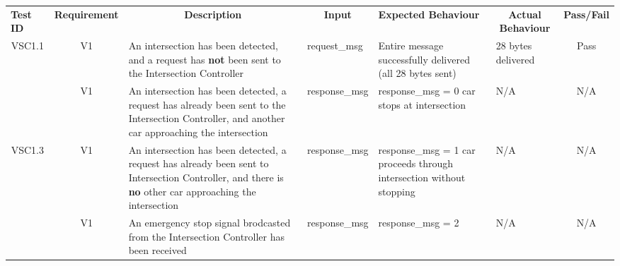\documentclass [10pt]{article}
\begin{document}
    
 \begin{longtable}{ | p{ } | p{ } |  p{ } |  p{ } | p{ } | p{ } |  p{ } |}  \hline

    \rowcolor{subsectionC}\textbf{Test ID}  
    & \textbf{Requirement}
    & \multicolumn{1}{c|}{\textbf{Description} }
    & \multicolumn{1}{c|}{\textbf{Input} }
    & \textbf{Expected Behaviour} 
    & \multicolumn{1}{c|}{\textbf{Actual Behaviour} }
    & \textbf{Pass/Fail} \\  
    
    
    
    
    \multicolumn{1}{|c|}{VSC1.1} 
    & \multicolumn{1}{c|}{V1}
    & An intersection has been detected, and a request has \textbf{not} been sent to the Intersection Controller \newline
    & request\_msg
    & Entire message successfully delivered (all 28 bytes sent)
    & 28 bytes delivered
    & \multicolumn{1}{c|}{Pass}\\  
     
    \rowcolor{tableCell}\multicolumn{1}{|c|}{VSC1.2} 
    & \multicolumn{1}{c|}{V1}
     & An intersection has been detected, a request has already been sent to the Intersection Controller, and another car approaching the intersection
    & response\_msg
    & response\_msg = 0\newline
      car stops at intersection
    & N/A
    & \multicolumn{1}{c|}{N/A}\\  
  
    
    \multicolumn{1}{|c|}{VSC1.3} 
    & \multicolumn{1}{c|}{V1}
    & An intersection has been detected, a request has already been sent to Intersection Controller, and there is \textbf{no} other car approaching the intersection
    & response\_msg
    & response\_msg = 1\newline
      car proceeds through intersection without stopping
    & N/A
    & \multicolumn{1}{c|}{N/A}\\  \hline
    
    \newpage \hline
    
    \rowcolor{tableCell}\multicolumn{1}{|c|}{VSC1.4} 
    & \multicolumn{1}{c|}{V1}
    & An emergency stop signal brodcasted from the Intersection Controller has been received
    & response\_msg
    & response\_msg = 2
    & N/A
    & \multicolumn{1}{c|}{N/A}\\  \hline
     
    \end{longtable}
\end{document}
